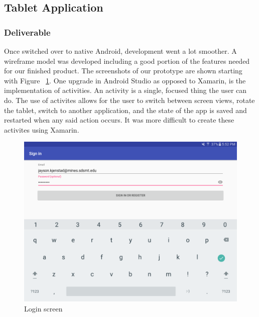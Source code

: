 \subsection{Tablet Application}
\subsubsection{Deliverable}
Once switched over to native Android, development went a lot smoother.  A wireframe model was developed including a good portion of the features needed for our finished product.  The screenshots of our prototype are shown starting with Figure ~\ref{fig:loginscreen}.  One upgrade in Android Studio as opposed to Xamarin, is the implementation of activities.  An activity is a single, focused thing the user can do.  The use of activites allows for the user to switch between screen views, rotate the tablet, switch to another application, and the state of the app is saved and restarted when any said action occurs.  It was more difficult to create these activites using Xamarin.  



\begin{figure}
\includegraphics[scale=0.45]{loginscreen.png}
\caption{Login screen}
\label{fig:loginscreen}
\end{figure}

